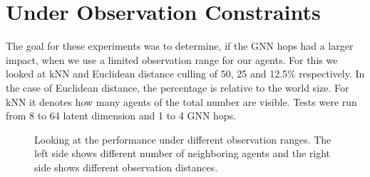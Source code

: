 \section{Under Observation Constraints}
\label{sec:Under Observation Constraints}
The goal for these experiments was to determine, if the GNN hops had a larger impact, when we use a limited observation range for our agents. For this we looked at kNN and Euclidean distance culling of 50, 25 and 12.5$\%$ respectively. In the case of Euclidean distance, the percentage is relative to the world size. For kNN it denotes how many agents of the total number are visible. Tests were run from 8 to 64 latent dimension and 1 to 4 GNN hops.

\begin{figure}[htp]
    \centering
    \hspace{1cm}                       
    \caption{Looking at the performance under different observation ranges. The left side shows different number of neighboring agents and the right side shows different observation distances.}
    \label{fig:observation-knnvsdistance}
\end{figure}

